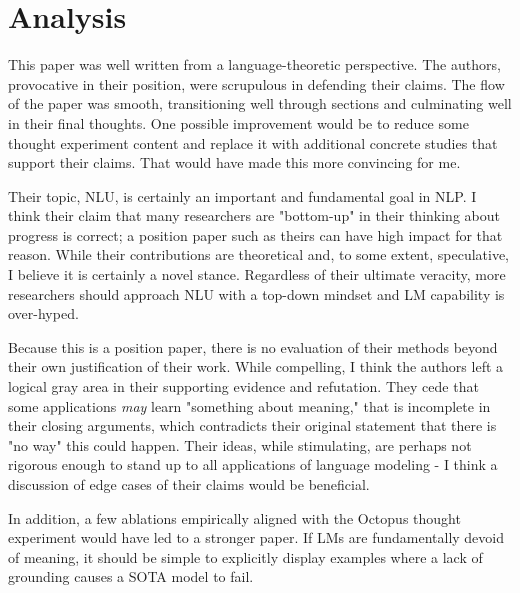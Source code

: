 \documentclass[11pt,a4paper]{article}
\begin{document}
\vspace{-2pt}
\section{Analysis}%
\label{sec:Analysis}

This paper was well written from a language-theoretic perspective. The authors, provocative in their position, were scrupulous in defending their claims. The flow of the paper was smooth, transitioning well through sections and culminating well in their final thoughts. One possible improvement would be to reduce some thought experiment content and replace it with additional concrete studies that support their claims. That would have made this more convincing for me.

Their topic, NLU, is certainly an important and fundamental goal in NLP. I think their claim that many researchers are "bottom-up" in their thinking about progress is correct; a position paper such as theirs can have high impact for that reason. While their contributions are theoretical and, to some extent, speculative, I believe it is certainly a novel stance. Regardless of their ultimate veracity, more researchers should approach NLU with a top-down mindset and LM capability is over-hyped.

Because this is a position paper, there is no evaluation of their methods beyond their own justification of their work. While compelling, I think the authors left a logical gray area in their supporting evidence and refutation. They cede that some applications \textit{may} learn "something about meaning," that is incomplete in their closing arguments, which contradicts their original statement that there is "no way" this could happen. Their ideas, while stimulating, are perhaps not rigorous enough to stand up to all applications of language modeling - I think a discussion of edge cases of their claims would be beneficial.

In addition, a few ablations empirically aligned with the Octopus thought experiment would have led to a 
stronger paper. If LMs are fundamentally devoid of meaning, it should be simple to explicitly display examples where a lack of grounding causes a SOTA model to fail.
\vspace{-10pt}


\end{document}
